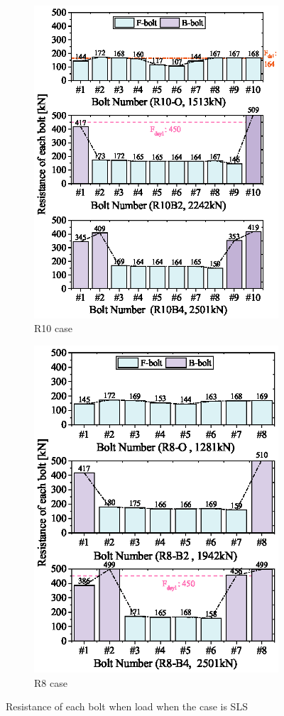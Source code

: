 \begin{figure}[htbp]
\begin{subfigure}[t]{0.49\textwidth}
      \centering
      \includegraphics[width=\linewidth]{imgs/ch5/R10BSratio-FSS.eps}
      \caption{R10 case}
      \label{fig-bsharer10}
    \end{subfigure}
    \hfill
    \begin{subfigure}[t]{\linewidth}
      \centering
      \includegraphics[width=0.49\linewidth]{imgs/ch5/R8BSratio-FSS.eps}
      \caption{R8 case}
      \label{fig-bsharer8}
    \end{subfigure}
\caption{Resistance of each bolt when load when the case is SLS}
\label{fig-bshare}
\end{figure}

